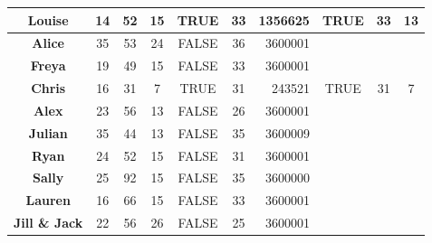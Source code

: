 \documentclass{report}
\theoremstyle{plain}
\begin{document}
\begin{figure}
\begin{tabular}{cc|c|c|c|c|r|c|c|c|}
\multicolumn{1}{|c|}{\textbf{Louise}}                & 14                & 52               & 15                    & TRUE            & 33                 & 1356625       & TRUE           & 33               & 13                    \\ \hline
\multicolumn{1}{|c|}{\textbf{Alice}}                 & 35                & 53               & 24                    & FALSE           & 36                 & 3600001       &                &                  &                       \\ \hline
\multicolumn{1}{|c|}{\textbf{Freya}}                 & 19                & 49               & 15                    & FALSE           & 33                 & 3600001       &                &                  &                       \\ \hline
\multicolumn{1}{|c|}{\textbf{Chris}}                 & 16                & 31               & 7                     & TRUE            & 31                 & 243521        & TRUE           & 31               & 7                     \\ \hline
\multicolumn{1}{|c|}{\textbf{Alex}}                  & 23                & 56               & 13                    & FALSE           & 26                 & 3600001       &                &                  &                       \\ \hline
\multicolumn{1}{|c|}{\textbf{Julian}}                & 35                & 44               & 13                    & FALSE           & 35                 & 3600009       &                &                  &                       \\ \hline
\multicolumn{1}{|c|}{\textbf{Ryan}}                  & 24                & 52               & 15                    & FALSE           & 31                 & 3600001       &                &                  &                       \\ \hline
\multicolumn{1}{|c|}{\textbf{Sally}}                 & 25                & 92               & 15                    & FALSE           & 35                 & 3600000       &                &                  &                       \\ \hline
\multicolumn{1}{|c|}{\textbf{Lauren}}                & 16                & 66               & 15                    & FALSE           & 33                 & 3600001       &                &                  &                       \\ \hline
\multicolumn{1}{|c|}{\textbf{Jill \& Jack}}          & 22                & 56               & 26                    & FALSE           & 25                 & 3600001       &                &                  &                       \\ \hline

\end{tabular}
\end{figure}
\end{document}
